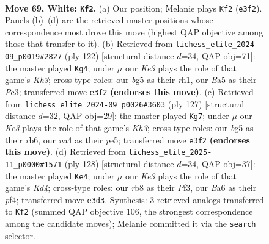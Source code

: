 \documentclass[11pt]{article}
\begin{document}
\clearpage

\begin{figure}[p]\centering
\begin{subfigure}{0.46\textwidth}\centering
\resizebox{\linewidth}{!}{%
\newchessgame
\chessboard[
  setfen={1r6/6k1/B2p3p/B3p1b1/n3P2p/4KP2/8/7R w - - 7 69},
  showmover=false,
  pgfstyle=straightmove, color=movearrow, markmove={e3-f2}
]}
\caption{}
\end{subfigure}\hfill
\begin{subfigure}{0.46\textwidth}\centering
\resizebox{\linewidth}{!}{%
\newchessgame
\chessboard[
  setfen={2R5/6pk/2p1p3/3b3P/3P3P/2P3BK/8/7r w - - 39 62},
  showmover=false,
  pgfstyle=straightmove, color=movearrow, markmove={h3-g4}
]}
\caption{}
\end{subfigure}
\\[4pt]
\begin{subfigure}{0.46\textwidth}\centering
\resizebox{\linewidth}{!}{%
\newchessgame
\chessboard[
  setfen={7r/7P/1R5k/4P1pb/4B3/pP3PK1/P7/8 b - - 2 64},
  showmover=false,
  pgfstyle=straightmove, color=movearrow, markmove={h6-g7}
]}
\caption{}
\end{subfigure}\hfill
\begin{subfigure}{0.46\textwidth}\centering
\resizebox{\linewidth}{!}{%
\newchessgame
\chessboard[
  setfen={8/2p4R/1p3kp1/3Pb2p/2PK1p2/5P2/8/8 w - - 1 65},
  showmover=false,
  pgfstyle=straightmove, color=movearrow, markmove={d4-e4}
]}
\caption{}
\end{subfigure}
\caption{\textbf{Move 69, White: \texttt{Kf2}.} (a) Our position; Melanie plays \texttt{Kf2} (\texttt{e3f2}). Panels (b)--(d) are the retrieved master positions whose correspondence most drove this move (highest QAP objective among those that transfer to it). (b) Retrieved from \texttt{lichess\_elite\_2024-09\_p0019\#2827} (ply 122) [structural distance $d$=34, QAP obj=71]: the master played \texttt{Kg4}; under $\mu$ our \emph{Ke3} plays the role of that game's \emph{Kh3}; cross-type roles: our \emph{b}g5 as their \emph{r}h1, our \emph{B}a5 as their \emph{P}c3; transferred move \texttt{e3f2} \textbf{(endorses this move)}. (c) Retrieved from \texttt{lichess\_elite\_2024-09\_p0026\#3603} (ply 127) [structural distance $d$=32, QAP obj=29]: the master played \texttt{Kg7}; under $\mu$ our \emph{Ke3} plays the role of that game's \emph{Kh3}; cross-type roles: our \emph{b}g5 as their \emph{r}b6, our \emph{n}a4 as their \emph{p}e5; transferred move \texttt{e3f2} \textbf{(endorses this move)}. (d) Retrieved from \texttt{lichess\_elite\_2025-11\_p0000\#1571} (ply 128) [structural distance $d$=34, QAP obj=37]: the master played \texttt{Ke4}; under $\mu$ our \emph{Ke3} plays the role of that game's \emph{Kd4}; cross-type roles: our \emph{r}b8 as their \emph{P}f3, our \emph{B}a6 as their \emph{p}f4; transferred move \texttt{e3d3}. Synthesis: 3 retrieved analogs transferred to \texttt{Kf2} (summed QAP objective 106, the strongest correspondence among the candidate moves); Melanie committed it via the \texttt{search} selector.}
\label{fig:thought-m136}
\end{figure}
\end{document}
